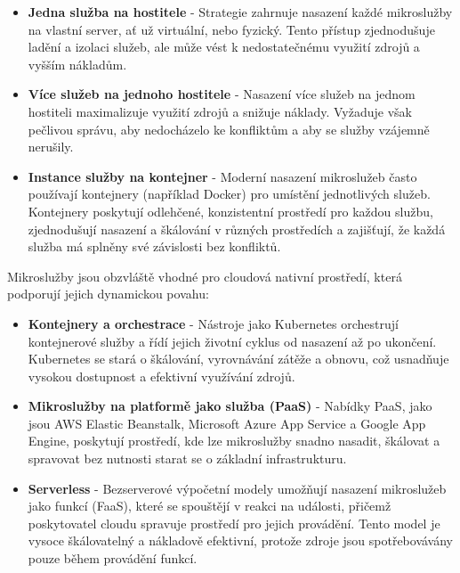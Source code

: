 \begin{itemize}
    \item \textbf{Jedna služba na hostitele} - Strategie zahrnuje nasazení každé mikroslužby na vlastní server, ať už virtuální, nebo fyzický. Tento přístup zjednodušuje ladění a izolaci služeb, ale může vést k nedostatečnému využití zdrojů a vyšším nákladům.
    \item \textbf{Více služeb na jednoho hostitele} - Nasazení více služeb na jednom hostiteli maximalizuje využití zdrojů a snižuje náklady. Vyžaduje však pečlivou správu, aby nedocházelo ke konfliktům a aby se služby vzájemně nerušily.
    \item \textbf{Instance služby na kontejner} - Moderní nasazení mikroslužeb často používají kontejnery (například Docker) pro umístění jednotlivých služeb. Kontejnery poskytují odlehčené, konzistentní prostředí pro každou službu, zjednodušují nasazení a škálování v různých prostředích a zajišťují, že každá služba má splněny své závislosti bez konfliktů.
\end{itemize}


Mikroslužby jsou obzvláště vhodné pro cloudová nativní prostředí, která podporují jejich dynamickou povahu:

\begin{itemize}
    \item \textbf{Kontejnery a orchestrace} - Nástroje jako Kubernetes orchestrují kontejnerové služby a řídí jejich životní cyklus od nasazení až po ukončení. Kubernetes se stará o škálování, vyrovnávání zátěže a obnovu, což usnadňuje vysokou dostupnost a efektivní využívání zdrojů.
    \item \textbf{Mikroslužby na platformě jako služba (PaaS)} - Nabídky PaaS, jako jsou AWS Elastic Beanstalk, Microsoft Azure App Service a Google App Engine, poskytují prostředí, kde lze mikroslužby snadno nasadit, škálovat a spravovat bez nutnosti starat se o základní infrastrukturu.
    \item \textbf{Serverless} - Bezserverové výpočetní modely umožňují nasazení mikroslužeb jako funkcí (FaaS), které se spouštějí v reakci na události, přičemž poskytovatel cloudu spravuje prostředí pro jejich provádění. Tento model je vysoce škálovatelný a nákladově efektivní, protože zdroje jsou spotřebovávány pouze během provádění funkcí.
\end{itemize}
